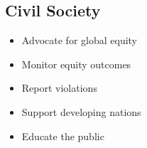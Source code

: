 \subsection{Civil Society}

\begin{itemize}
    \item Advocate for global equity
    \item Monitor equity outcomes
    \item Report violations
    \item Support developing nations
    \item Educate the public
\end{itemize}

\cleardoublepage
